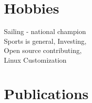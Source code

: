 \documentclass[]{deedy-resume-openfont}
\begin{document}
\begin{minipage}[t]{0.66\textwidth}

%
%


\section{Hobbies} 

Sailing - national champion \\ 
Sports is general, Investing, \\
Open source contributing, \\
Linux Customization \\

\sectionspace %


\section{Publications} 
\renewcommand\refname{\vskip -1.5em} %


\nocite{*}

\end{minipage} %



\end{document}
